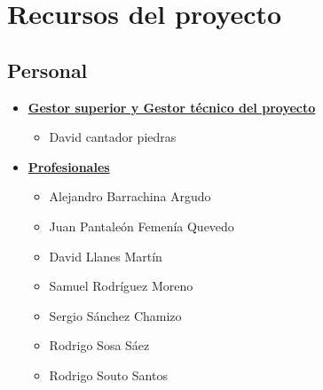 \section{Recursos del proyecto}

\subsection{Personal}
\begin{itemize}
	\item \textbf{\underline{Gestor superior y Gestor técnico del proyecto}}
	      \begin{itemize}
		      \item David cantador piedras
	      \end{itemize}
	\item \textbf{\underline{Profesionales}}
	      \begin{itemize}
		      \item Alejandro Barrachina Argudo
		      \item Juan Pantaleón Femenía Quevedo
		      \item David Llanes Martín
		      \item Samuel Rodríguez Moreno
		      \item Sergio Sánchez Chamizo
		      \item Rodrigo Sosa Sáez
		      \item Rodrigo Souto Santos
	      \end{itemize}
\end{itemize}

